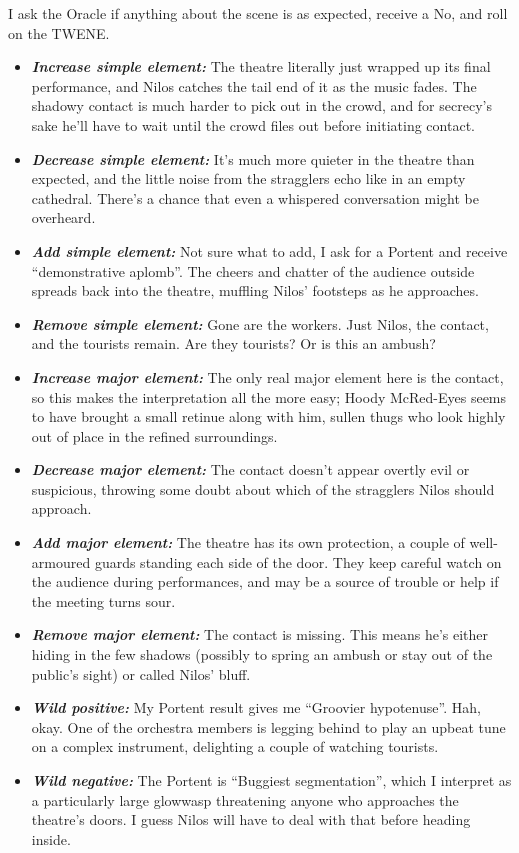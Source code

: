 \documentclass[12pt, letterpaper]{article}
\begin{document}
I ask the Oracle if anything about the scene is as expected, receive a No, and roll on the TWENE.
\begin{itemize}
\item \textit{\textbf{Increase simple element:}} The theatre literally just wrapped up its final performance, and Nilos catches the tail end of it as the music fades. The shadowy contact is much harder to pick out in the crowd, and for secrecy's sake he'll have to wait until the crowd files out before initiating contact.
\item \textit{\textbf{Decrease simple element:}} It's much more quieter in the theatre than expected, and the little noise from the stragglers echo like in an empty cathedral. There's a chance that even a whispered conversation might be overheard.
\item \textit{\textbf{Add simple element:}} Not sure what to add, I ask for a Portent and receive ``demonstrative aplomb''. The cheers and chatter of the audience outside spreads back into the theatre, muffling Nilos' footsteps as he approaches.
\item \textit{\textbf{Remove simple element:}} Gone are the workers. Just Nilos, the contact, and the tourists remain. Are they tourists? Or is this an ambush?
\item \textit{\textbf{Increase major element:}} The only real major element here is the contact, so this makes the interpretation all the more easy; Hoody McRed-Eyes seems to have brought a small retinue along with him, sullen thugs who look highly out of place in the refined surroundings.
\item \textit{\textbf{Decrease major element:}} The contact doesn't appear overtly evil or suspicious, throwing some doubt about which of the stragglers Nilos should approach.
\item \textit{\textbf{Add major element:}} The theatre has its own protection, a couple of well-armoured guards standing each side of the door. They keep careful watch on the audience during performances, and may be a source of trouble or help if the meeting turns sour.
\item \textit{\textbf{Remove major element:}} The contact is missing. This means he's either hiding in the few shadows (possibly to spring an ambush or stay out of the public's sight) or called Nilos' bluff.
\item \textit{\textbf{Wild positive:}} My Portent result gives me ``Groovier hypotenuse''. Hah, okay. One of the orchestra members is legging behind to play an upbeat tune on a complex instrument, delighting a couple of watching tourists.
\item \textit{\textbf{Wild negative:}} The Portent is ``Buggiest segmentation'', which I interpret as a particularly large glowwasp threatening anyone who approaches the theatre's doors. I guess Nilos will have to deal with that before heading inside.
\end{itemize}
\end{document}
